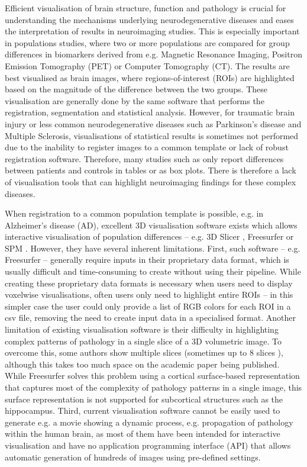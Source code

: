\documentclass{llncs}
\begin{document}
Efficient visualisation of brain structure, function and pathology is crucial for understanding the mechanisms underlying neurodegenerative diseases and eases the interpretation of results in neuroimaging studies. This is especially important in populations studies, where two or more populations are compared for group differences in biomarkers derived from e.g. Magnetic Resonance Imaging, Positron Emission Tomography (PET) or Computer Tomography (CT). The results are best visualised as brain images, where regions-of-interest (ROIs) are highlighted based on the magnitude of the difference between the two groups. These visualisation are generally done by the same software that performs the registration, segmentation and statistical analysis. However, for traumatic brain injury or less common neurodegenerative diseases such as Parkinson's disease and Multiple Sclerosis, visualisations of statistical results is sometimes not performed due to the inability to register images to a common template or lack of robust registration software. Therefore, many studies such as \cite{coughlin2015neuroinflammation,schoonheim2012subcortical} only report differences between patients and controls in tables or as box plots. There is therefore a lack of visualisation tools that can highlight neuroimaging findings for these complex diseases.

When registration to a common population template is possible, e.g. in Alzheimer's disease (AD), excellent 3D visualisation software exists  which allows interactive visualisation of population differences -- e.g. 3D Slicer \cite{pieper20043d}, Freesurfer \cite{fischl2012freesurfer} or SPM \cite{penny2011statistical}. However, they have several inherent limitations. First, such software -- e.g. Freesurfer -- generally require inputs in their proprietary data format, which is usually difficult and time-consuming to create without using their pipeline. While creating these proprietary data formats is necessary when users need to display voxelwise visualisations, often users only need to highlight entire ROIs -- in this simpler case the user could only provide a list of RGB colors for each ROI in a csv file, removing the need to create input data in a specialised format. Another limitation of existing visualisation software is their difficulty in highlighting complex patterns of pathology in a single slice of a 3D volumetric image. To overcome this, some authors show multiple slices (sometimes up to 8 slices \cite{migliaccio2015mapping}), although this takes too much space on the academic paper being published. While Freesurfer solves this problem using a cortical surface-based representation that captures most of the complexity of pathology patterns in a single image, this surface representation is not supported for subcortical structures such as the hippocampus. Third, current visualisation software cannot be easily used to generate e.g. a movie showing a dynamic process, e.g. propagation of pathology within the human brain, as most of them have been intended for interactive visualisation and have no application programming interface (API) that allows automatic generation of hundreds of images using pre-defined settings. 
\end{document}
